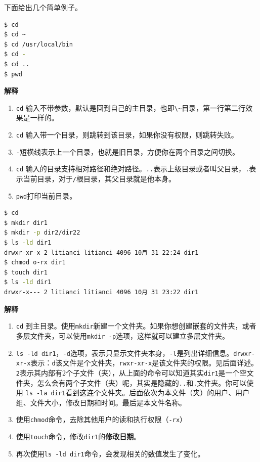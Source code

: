 \documentclass[doctor,openright,twoside]{sjtuthesis}
\providecommand{\tightlist}{%
    \setlength{\itemsep}{0pt}\setlength{\parskip}{0pt}}
\newcommand{\passthrough}[1]{#1}
\theoremstyle{plain}
\theoremstyle{definition}
\theoremstyle{remark}
\theoremstyle{ocrenumbox}
\theoremstyle{plain}
\begin{document}
下面给出几个简单例子。

\begin{lstlisting}[language=bash]
$ cd
$ cd ~
$ cd /usr/local/bin
$ cd -
$ cd ..
$ pwd
\end{lstlisting}

\textbf{解释}

\begin{enumerate}
\def\labelenumi{\arabic{enumi}.}
\tightlist
\item
  \passthrough{\lstinline!cd!}
  输入不带参数，默认是回到自己的主目录，也即\passthrough{\lstinline!\~!}目录，第一行第二行效果是一样的。
\item
  \passthrough{\lstinline!cd!}
  输入带一个目录，则跳转到该目录，如果你没有权限，则跳转失败。
\item
  \passthrough{\lstinline!-!}短横线表示上一个目录，也就是旧目录，方便你在两个目录之间切换。
\item
  \passthrough{\lstinline!cd!}
  输入的目录支持相对路径和绝对路径。\passthrough{\lstinline!..!}表示上级目录或者叫父目录，\passthrough{\lstinline!.!}表示当前目录，对于\passthrough{\lstinline!/!}根目录，其父目录就是他本身。
\item
  \passthrough{\lstinline!pwd!}打印当前目录。
\end{enumerate}

\begin{lstlisting}[language=bash]
$ cd
$ mkdir dir1
$ mkdir -p dir2/dir22
$ ls -ld dir1
drwxr-xr-x 2 litianci litianci 4096 10月 31 22:24 dir1
$ chmod o-rx dir1
$ touch dir1
$ ls -ld dir1
drwxr-x--- 2 litianci litianci 4096 10月 31 23:22 dir1
\end{lstlisting}

\textbf{解释}

\begin{enumerate}
\def\labelenumi{\arabic{enumi}.}
\tightlist
\item
  \passthrough{\lstinline!cd!}
  到主目录。使用\passthrough{\lstinline!mkdir!}新建一个文件夹。如果你想创建嵌套的文件夹，或者多层文件夹，可以使用\passthrough{\lstinline!mkdir -p!}选项，这样就可以建立多层文件夹。
\item
  \passthrough{\lstinline!ls -ld dir1!}，\passthrough{\lstinline!-d!}选项，表示只显示文件夹本身，\passthrough{\lstinline!-l!}是列出详细信息。\passthrough{\lstinline!drwxr-xr-x!}表示：\passthrough{\lstinline!d!}该文件是个文件夹，\passthrough{\lstinline!rwxr-xr-x!}是该文件夹的权限。见后面详述。\passthrough{\lstinline!2!}表示其内部有2个子文件（夹），从上面的命令可以知道其实\passthrough{\lstinline!dir1!}是一个空文件夹，怎么会有两个子文件（夹）呢，其实是隐藏的\passthrough{\lstinline!..!}和\passthrough{\lstinline!.!}文件夹。你可以使用
  \passthrough{\lstinline!ls -la dir1!}看到这连个文件夹。后面依次为本文件（夹）的用户、用户组、文件大小，修改日期和时间。最后是本文件名称。
\item
  使用\passthrough{\lstinline!chmod!}命令，去除其他用户的读和执行权限（\passthrough{\lstinline!-rx!}）
\item
  使用\passthrough{\lstinline!touch!}命令，修改\passthrough{\lstinline!dir1!}的\textbf{修改日期}。
\item
  再次使用\passthrough{\lstinline!ls -ld dir1!}命令，会发现相关的数值发生了变化。
\end{enumerate}
\end{document}

